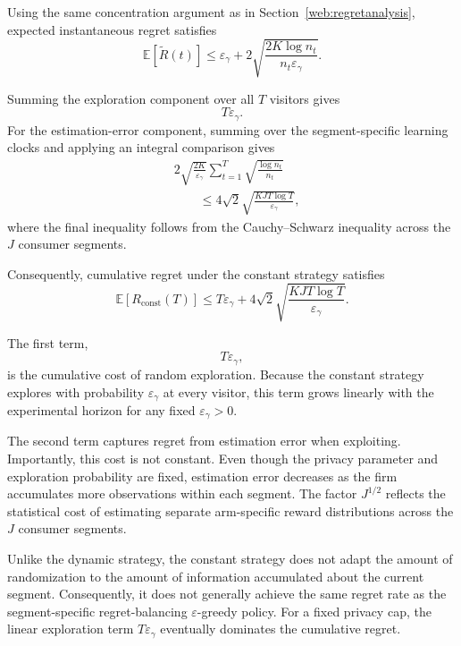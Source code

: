 \documentclass[mksc,nonblindrev]{informs3}
\begin{document}
\begin{APPENDICES}
Using the same concentration argument as in Section~\ref{web:regretanalysis}, expected instantaneous regret satisfies
\begin{equation}
\label{eq:constant-perround}
\mathbb E[\widetilde R(t)]
\leq
\varepsilon_\gamma
+
2
\sqrt{
\frac{2K\log n_t}
{n_t\varepsilon_\gamma}
}.
\end{equation}

Summing the exploration component over all \(T\) visitors gives
\[
T\varepsilon_\gamma.
\]
For the estimation-error component, summing over the segment-specific learning clocks and applying an integral comparison gives
\begin{align}
&
2\sqrt{\frac{2K}{\varepsilon_\gamma}}
\sum_{t=1}^{T}
\sqrt{\frac{\log n_t}{n_t}}
\nonumber\\
&\qquad\leq
4\sqrt{2}
\sqrt{
\frac{KJT\log T}
{\varepsilon_\gamma}
},
\end{align}
where the final inequality follows from the Cauchy--Schwarz inequality across the \(J\) consumer segments.

Consequently, cumulative regret under the constant strategy satisfies
\begin{equation}
\label{eq:constant-regret}
\boxed{
\mathbb E[R_{\mathrm{const}}(T)]
\leq
T\varepsilon_\gamma
+
4\sqrt{2}
\sqrt{
\frac{KJT\log T}
{\varepsilon_\gamma}
}.
}
\end{equation}

The first term,
\[
T\varepsilon_\gamma,
\]
is the cumulative cost of random exploration. Because the constant strategy explores with probability \(\varepsilon_\gamma\) at every visitor, this term grows linearly with the experimental horizon for any fixed \(\varepsilon_\gamma>0\).

The second term captures regret from estimation error when exploiting. Importantly, this cost is not constant. Even though the privacy parameter and exploration probability are fixed, estimation error decreases as the firm accumulates more observations within each segment. The factor \(J^{1/2}\) reflects the statistical cost of estimating separate arm-specific reward distributions across the \(J\) consumer segments.

Unlike the dynamic strategy, the constant strategy does not adapt the amount of randomization to the amount of information accumulated about the current segment. Consequently, it does not generally achieve the same regret rate as the segment-specific regret-balancing $\varepsilon$-greedy policy. For a fixed privacy cap, the linear exploration term \(T\varepsilon_\gamma\) eventually dominates the cumulative regret.



\end{APPENDICES}
\end{document}
